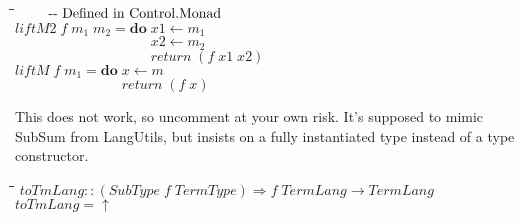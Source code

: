 \documentclass[10pt]{article}
\newlength{\lwidth}\setlength{\lwidth}{4.5cm}
\newlength{\cwidth}\setlength{\cwidth}{8mm} %
\newcommand{\Conid}[1]{\mathit{#1}}
\newcommand{\Varid}[1]{\mathit{#1}}
\begin{document}
\begin{tabbing}
\qquad\=\hspace{\lwidth}\=\hspace{\cwidth}\=\+\kill
${\mbox{\qquad-{}-  Defined in Control.Monad}}$\\
${\Varid{liftM2}\;\Varid{f}\;\Varid{m}_1\;\Varid{m}_2\mathrel{=}\mathbf{do}\;\Varid{x1}\leftarrow \Varid{m}_1}$\\
${\phantom{\Varid{liftM2}\;\Varid{f}\;\Varid{m}_1\;\Varid{m}_2\mathrel{=}\mathbf{do}\;\mbox{}}\Varid{x2}\leftarrow \Varid{m}_2}$\\
${\phantom{\Varid{liftM2}\;\Varid{f}\;\Varid{m}_1\;\Varid{m}_2\mathrel{=}\mathbf{do}\;\mbox{}}\Varid{return}\;(\Varid{f}\;\Varid{x1}\;\Varid{x2})}$\\
${}$\\
${\Varid{liftM}\;\Varid{f}\;\Varid{m}_1\mathrel{=}\mathbf{do}\;\Varid{x}\leftarrow \Varid{m}}$\\
${\phantom{\Varid{liftM}\;\Varid{f}\;\Varid{m}_1\mathrel{=}\mathbf{do}\;\mbox{}}\Varid{return}\;(\Varid{f}\;\Varid{x})}$
\end{tabbing}
This does not work, so uncomment at your own risk.  It's supposed to
mimic SubSum from LangUtils, but insists on a fully instantiated type
instead of a type constructor.

\begin{tabbing}
\qquad\=\hspace{\lwidth}\=\hspace{\cwidth}\=\+\kill
${\Varid{toTmLang}\mathbin{::}(\Conid{SubType}\;\Varid{f}\;\Conid{TermType})\Rightarrow \Varid{f}\;\Conid{TermLang}\to \Conid{TermLang}}$\\
${\Varid{toTmLang}\mathrel{=}\Varid{\uparrow}}$
\end{tabbing}
\end{document}
